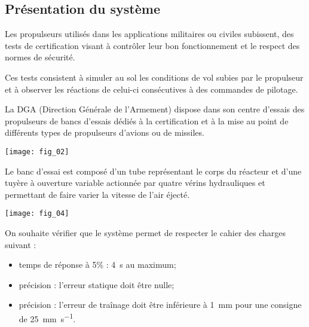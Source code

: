 \normaltrue \difficilefalse \tdifficilefalse
\correctionfalse




\setcounter{question}{0}
\ifcorrection
\else
{}
\fi


\subsection*{Présentation du système}
\ifprof
\else
Les propulseurs utilisés dans les applications militaires ou civiles subissent, des tests de certification
visant à contrôler leur bon fonctionnement et le respect des normes de sécurité.

Ces tests consistent à simuler au sol les conditions de vol subies par le propulseur et à observer les réactions de celui-ci
consécutives à des commandes de pilotage. 

La DGA (Direction Générale de l'Armement) dispose dans son centre d'essais des propulseurs de bancs d'essais
dédiés à la certification et à la mise au point de différents types de propulseurs d'avions ou de missiles.

\begin{center}
\texttt{[image: fig\_02]}
\end{center}

Le banc d'essai est composé d'un tube représentant le corps du réacteur et d'une tuyère à ouverture variable
actionnée par quatre vérins hydrauliques et permettant de faire varier la vitesse de l'air éjecté. 


\begin{center}
\texttt{[image: fig\_04]}
\end{center}

\fi

\begin{obj}
On souhaite vérifier que le système permet de respecter le cahier des charges suivant : 
\begin{itemize}
\item temps de réponse à 5\% : \SI{4}{s} au maximum;
\item précision : l'erreur statique doit être nulle;
\item précision : l'erreur de traînage doit être inférieure à \SI{1}{mm} pour une consigne de \SI{25}{mm.s^{-1}}.
\end{itemize}
\end{obj}


